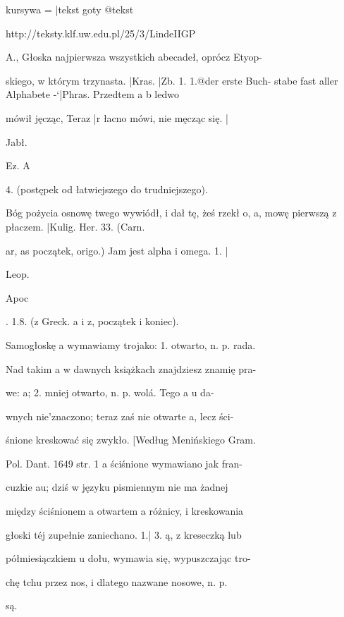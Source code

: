﻿kursywa = |{tekst}
goty @{tekst}

http://teksty.klf.uw.edu.pl/25/3/LindeIIGP%


A., Głoska najpierwsza wszystkich abecadeł, oprócz Etyop-

  skiego, w którym trzynasta. |{Kras}. |{Zb}. 1. 1.@{der erste Buch-
  stabe fast aller Alphabete} -`|{Phras}. Przedtem a b ledwo

  mówił jęcząc, Teraz |{r łacno} mówi, nie męcząc się. |{Jabł.

  Ez. A} 4. (postępek od łatwiejszego do trudniejszego).

  Bóg pożycia osnowę twego wywiódł, i dał tę, żeś rzekł
  o, a, mowę pierwszą z płaczem. |{Kulig. Her}. 33. (Carn.

  ar, as początek, origo.) Jam jest alpha i omega. 1. |{Leop.

  Apoc}. 1.8. (z Greck. a i z, początek i koniec).


Samogłoskę a wymawiamy trojako: 1. otwarto, n. p. rada.

  Nad takim a w dawnych książkach znajdziesz znamię pra-

  we: a; 2. mniej otwarto, n. p. wolá. Tego a u da-

  wnych nie'znaczono; teraz zaś nie otwarte a, lecz ści-

  śnione kreskować się zwykło. [Według Menińskiego Gram.

  Pol. Dant. 1649 str. 1 a ściśnione wymawiano jak fran-

  cuzkie au; dziś w języku pismiennym nie ma żadnej

  między ściśnionem a otwartem a różnicy, i kreskowania

  głoski téj zupełnie zaniechano. 1.| 3. ą, z kreseczką lub

  półmiesiączkiem u dołu, wymawia się, wypuszczając tro-


  chę tchu przez nos, i dlatego nazwane nosowe, n. p.

  są.


\endinput

A., Głoska najpierwsza wszystkich abecadeł, oprócz Etyop-

  skiego, wktórym trzynasta. Kras. Zb. l. l., der erste Buch-

  stabe fast aller Alphabete. -`- Phras. Przedtem' a `b ledwo

  mówił jęcząc, Teraz 7' łacno mówi, nie męcząc się. Jab?.

